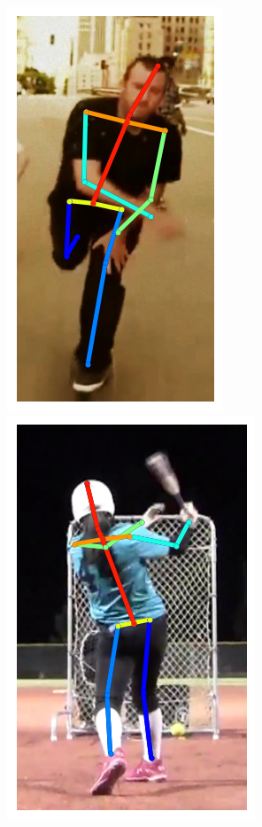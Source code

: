 \begin{figure}[t!]
    \includegraphics[height=\flowh]{resources/Human_Poses/pose/qualitative/pred-5}
    \hfill
    \includegraphics[height=\flowh]{resources/Human_Poses/pose/qualitative/pred-6}
    \hfill

\end{figure}
